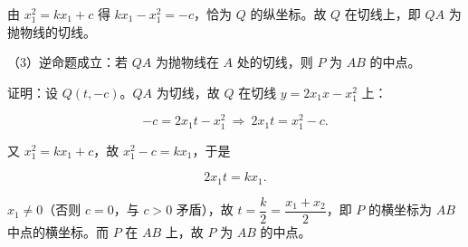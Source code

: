 \begin{answer}
由 $x_1^2=kx_1+c$ 得 $kx_1-x_1^2=-c$，恰为 $Q$ 的纵坐标。故 $Q$ 在切线上，即 $QA$ 为抛物线的切线。

（3）逆命题成立：若 $QA$ 为抛物线在 $A$ 处的切线，则 $P$ 为 $AB$ 的中点。

证明：设 $Q(t,-c)$。$QA$ 为切线，故 $Q$ 在切线 $y=2x_1x-x_1^2$ 上：

\nopagebreak[4]
\[-c=2x_1t-x_1^2\ \Rightarrow\ 2x_1t=x_1^2-c.\]

又 $x_1^2=kx_1+c$，故 $x_1^2-c=kx_1$，于是

\nopagebreak[4]
\[2x_1t=kx_1.\]

$x_1\neq0$（否则 $c=0$，与 $c>0$ 矛盾），故 $t=\dfrac k2=\dfrac{x_1+x_2}{2}$，即 $P$ 的横坐标为 $AB$ 中点的横坐标。而 $P$ 在 $AB$ 上，故 $P$ 为 $AB$ 的中点。


\end{answer}
